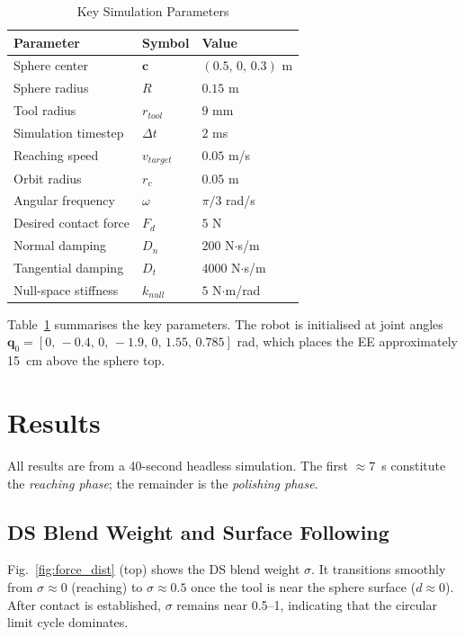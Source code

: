 \documentclass[conference]{IEEEtran}
\newcommand{\qq}{\mathbf{q}}
\begin{document}
\begin{table}[t]
\centering
\caption{Key Simulation Parameters}
\label{tab:params}
\begin{tabular}{lll}
\toprule
Parameter & Symbol & Value \\
\midrule
Sphere center & $\mathbf{c}$ & $(0.5,\,0,\,0.3)$ m \\
Sphere radius & $R$ & $0.15$ m \\
Tool radius & $r_{tool}$ & $9$ mm \\
Simulation timestep & $\Delta t$ & $2$ ms \\
Reaching speed & $v_{target}$ & $0.05$ m/s \\
Orbit radius & $r_c$ & $0.05$ m \\
Angular frequency & $\omega$ & $\pi/3$ rad/s \\
Desired contact force & $F_d$ & $5$ N \\
Normal damping & $D_n$ & $200$ N$\cdot$s/m \\
Tangential damping & $D_t$ & $4000$ N$\cdot$s/m \\
Null-space stiffness & $k_{null}$ & $5$ N$\cdot$m/rad \\
\bottomrule
\end{tabular}
\end{table}

Table~\ref{tab:params} summarises the key parameters. The robot is initialised
at joint angles $\qq_0 = [0,\,-0.4,\,0,\,-1.9,\,0,\,1.55,\,0.785]$ rad, which
places the EE approximately 15~cm above the sphere top.

\section{Results}
\label{sec:results}

All results are from a 40-second headless simulation. The first $\approx7$~s
constitute the \emph{reaching phase}; the remainder is the \emph{polishing phase}.

\subsection{DS Blend Weight and Surface Following}

Fig.~\ref{fig:force_dist} (top) shows the DS blend weight $\sigma$.
It transitions smoothly from $\sigma \approx 0$ (reaching) to $\sigma \approx 0.5$
once the tool is near the sphere surface ($d \approx 0$). After contact is
established, $\sigma$ remains near 0.5–1, indicating that the circular limit
cycle dominates.
\end{document}

